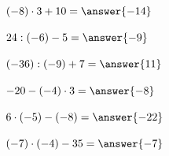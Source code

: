 \documentclass{ximera}
\begin{document}
\begin{oefening}{\oefB\ESS}
\begin{question} \((-8)\cdot3+10=\answer{-14}\) \end{question}

\begin{question} \(24:(-6)-5=\answer{-9}\) \end{question}

\begin{question} \((-36):(-9)+7=\answer{11}\) \end{question}

\begin{question} \(-20-(-4)\cdot3=\answer{-8}\) \end{question}

\begin{question} \(6\cdot(-5)-(-8)=\answer{-22}\) \end{question}

\begin{question} \((-7)\cdot(-4)-35=\answer{-7}\) \end{question}

\end{oefening}


\end{document}
